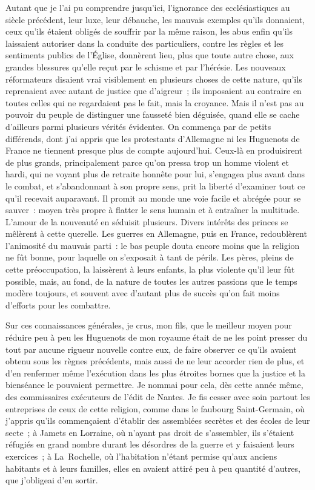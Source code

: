 \documentclass[french,twoside]{book} %
\begin{document}
Autant que je l’ai pu comprendre jusqu’ici, l’ignorance des ecclésiastiques au siècle précédent, leur luxe, leur débauche, les mauvais exemples qu’ils donnaient, ceux qu’ils étaient obligés de souffrir par la même raison, les abus enfin qu’ils laissaient autoriser dans la conduite des particuliers, contre les règles et les sentiments publics de l’Église, donnèrent lieu, plus que toute autre chose, aux grandes blessures qu’elle reçut par le schisme et par l’hérésie. Les nouveaux réformateurs disaient vrai visiblement en plusieurs choses de cette nature, qu’ils reprenaient avec autant de justice que d’aigreur ; ils imposaient au contraire en toutes celles qui ne regardaient pas le fait, mais la croyance. Mais il n’est pas au pouvoir du peuple de distinguer une fausseté bien déguisée, quand elle se cache d’ailleurs parmi plusieurs vérités évidentes. On commença par de petits différends, dont j’ai appris que les protestants d’Allemagne ni les Huguenots de France ne tiennent presque plus de compte aujourd’hui. Ceux-là en produisirent de plus grands, principalement parce qu’on pressa trop un homme violent et hardi, qui ne voyant plus de retraite honnête pour lui, s’engagea plus avant dans le combat, et s’abandonnant à son propre sens, prit la liberté d’examiner tout ce qu’il recevait auparavant. Il promit au monde une voie facile et abrégée pour se sauver : moyen très propre à flatter le sens humain et à entraîner la multitude. L’amour de la nouveauté en séduisit plusieurs. Divers intérêts des princes se mêlèrent à cette querelle. Les guerres en Allemagne, puis en France, redoublèrent l’animosité du mauvais parti : le bas peuple douta encore moins que la religion ne fût bonne, pour laquelle on s’exposait à tant de périls. Les pères, pleins de cette préoccupation, la laissèrent à leurs enfants, la plus violente qu’il leur fût possible, mais, au fond, de la nature de toutes les autres passions que le temps modère toujours, et souvent avec d’autant plus de succès qu’on fait moins d’efforts pour les combattre.\par
Sur ces connaissances générales, je crus, mon fils, que le meilleur moyen pour réduire peu à peu les Huguenots de mon royaume était de ne les point presser du tout par aucune rigueur nouvelle contre eux, de faire observer ce qu’ils avaient obtenu sous les règnes précédents, mais aussi de ne leur accorder rien de plus, et d’en renfermer même l’exécution dans les plus étroites bornes que la justice et la bienséance le pouvaient permettre. Je nommai pour cela, dès cette année même, des commissaires exécuteurs de l’édit de Nantes. Je fis cesser avec soin partout les entreprises de ceux de cette religion, comme dans le faubourg Saint-Germain, où j’appris qu’ils commençaient d’établir des assemblées secrètes et des écoles de leur secte ; à Jamets en Lorraine, où n’ayant pas droit de s’assembler, ils s’étaient réfugiés en grand nombre durant les désordres de la guerre et y faisaient leurs exercices ; à La Rochelle, où l’habitation n’étant permise qu’aux anciens habitants et à leurs familles, elles en avaient attiré peu à peu quantité d’autres, que j’obligeai d’en sortir.\par
\end{document}
